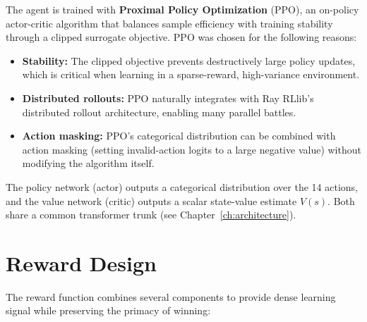 The agent is trained with \textbf{Proximal Policy Optimization} (PPO), an
on-policy actor-critic algorithm that balances sample efficiency with training
stability through a clipped surrogate objective.  PPO was chosen for the
following reasons:

\begin{itemize}
  \item \textbf{Stability:} The clipped objective prevents destructively large
        policy updates, which is critical when learning in a sparse-reward,
        high-variance environment.
  \item \textbf{Distributed rollouts:} PPO naturally integrates with Ray
        RLlib's distributed rollout architecture, enabling many parallel
        battles.
  \item \textbf{Action masking:} PPO's categorical distribution can be
        combined with action masking (setting invalid-action logits to a large
        negative value) without modifying the algorithm itself.
\end{itemize}

The policy network (actor) outputs a categorical distribution over the 14
actions, and the value network (critic) outputs a scalar state-value estimate
$V(s)$.  Both share a common transformer trunk (see
Chapter~\ref{ch:architecture}).

\section{Reward Design}
\label{sec:reward_design}

The reward function combines several components to provide dense learning signal
while preserving the primacy of winning:

